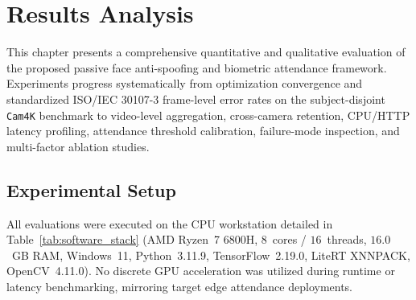 \chapter{Results Analysis}
\label{chap:results}

This chapter presents a comprehensive quantitative and qualitative evaluation of the proposed passive face anti-spoofing and biometric attendance framework. Experiments progress systematically from optimization convergence and standardized ISO/IEC 30107-3 frame-level error rates on the subject-disjoint \texttt{Cam4K} benchmark to video-level aggregation, cross-camera retention, CPU/HTTP latency profiling, attendance threshold calibration, failure-mode inspection, and multi-factor ablation studies.

\section{Experimental Setup}
\label{sec:experimental_setup}

All evaluations were executed on the CPU workstation detailed in Table~\ref{tab:software_stack} (AMD Ryzen~7 6800H, $8$~cores / $16$~threads, $16.0$~GB RAM, Windows~11, Python~3.11.9, TensorFlow~2.19.0, LiteRT XNNPACK, OpenCV~4.11.0). No discrete GPU acceleration was utilized during runtime or latency benchmarking, mirroring target edge attendance deployments.

